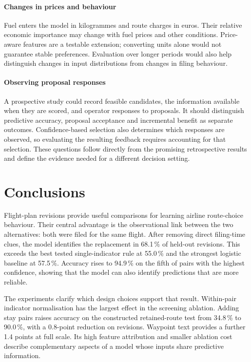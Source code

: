\documentclass[preprint,authoryear,12pt]{elsarticle}
\begin{document}
\paragraph{Changes in prices and behaviour}
Fuel enters the model in kilogrammes and route charges in euros.
Their relative economic importance may change with fuel prices and
other conditions. Price-aware features are a testable extension;
converting units alone would not guarantee stable preferences.
Evaluation over longer periods would also help distinguish changes
in input distributions from changes in filing behaviour.

\paragraph{Observing proposal responses}
A prospective study could record feasible candidates, the information
available when they are scored, and operator responses to proposals.
It should distinguish predictive accuracy, proposal acceptance and
incremental benefit as separate outcomes. Confidence-based selection
also determines which responses are observed, so evaluating the
resulting feedback requires accounting for that selection. These
questions follow directly from the promising retrospective results
and define the evidence needed for a different decision setting.

\section{Conclusions}
\label{sec:conclusions}

Flight-plan revisions provide useful comparisons for learning airline
route-choice behaviour. Their central advantage is the observational
link between the two alternatives: both were filed for the same flight.
After removing direct filing-time clues, the model identifies the
replacement in 68.1\,\% of held-out revisions. This exceeds the best
tested single-indicator rule at 55.0\,\% and the strongest logistic
baseline at 57.5\,\%. Accuracy rises to 94.9\,\% on the fifth of
pairs with the highest confidence, showing that the model can also
identify predictions that are more reliable.

The experiments clarify which design choices support that result.
Within-pair indicator normalisation has the largest effect in the
screening ablation. Adding stay pairs raises accuracy on the constructed
retained-route test from 34.8\,\% to 90.0\,\%, with a 0.8-point
reduction on revisions. Waypoint text provides a further 1.4 points
at full scale. Its high feature attribution and smaller ablation
cost describe complementary aspects of a model whose inputs share
predictive information.
\end{document}
